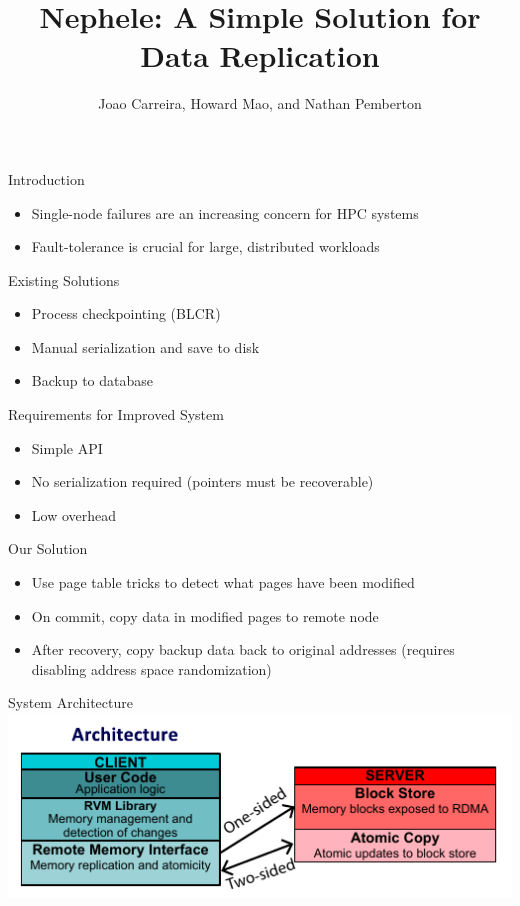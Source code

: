 \documentclass{beamer}
\begin{document}
\title{Nephele: A Simple Solution for Data Replication}
\author{Joao Carreira, Howard Mao, and Nathan Pemberton}

\graphicspath{{../figures/}}

\frame{\titlepage}

\begin{frame}{Introduction}
    \begin{itemize}
        \item Single-node failures are an increasing concern for HPC systems
        \item Fault-tolerance is crucial for large, distributed workloads
    \end{itemize}
\end{frame}

\begin{frame}{Existing Solutions}
    \begin{itemize}
        \item Process checkpointing (BLCR)
        \item Manual serialization and save to disk
        \item Backup to database
    \end{itemize}
\end{frame}

\begin{frame}{Requirements for Improved System}
    \begin{itemize}
        \item Simple API
        \item No serialization required (pointers must be recoverable)
        \item Low overhead
    \end{itemize}
\end{frame}

\begin{frame}{Our Solution}
    \begin{itemize}
        \item Use page table tricks to detect what pages have been modified
        \item On commit, copy data in modified pages to remote node
        \item After recovery, copy backup data back to original addresses
            (requires disabling address space randomization)
    \end{itemize}
\end{frame}

\begin{frame}{System Architecture}
    \centering
    \includegraphics{lasagna.pdf}
\end{frame}
\end{document}
